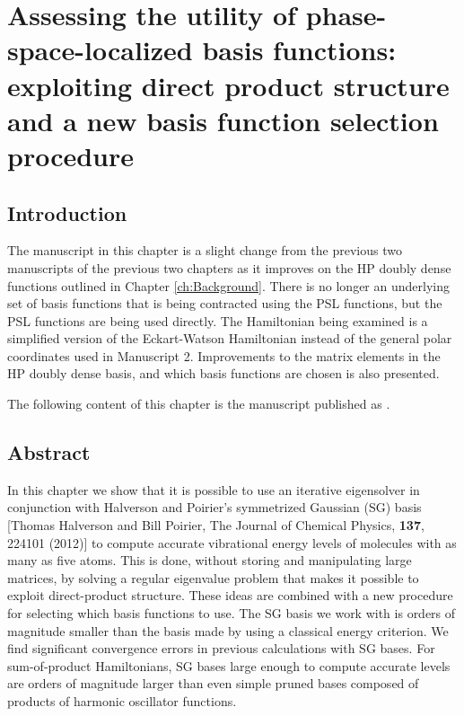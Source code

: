 
%
\chapter{Assessing the utility of phase-space-localized basis functions:  exploiting direct product structure and  a new basis function selection procedure \label{ch:JCP2} }
\thispagestyle{empty}
\section{Introduction}
The manuscript in this chapter is a slight change from the previous two manuscripts of the previous two chapters as it improves on the HP doubly dense functions outlined in Chapter \ref{ch:Background}.  There is no longer an underlying set of basis functions that is being contracted using the PSL functions, but the PSL functions are being used directly.  The Hamiltonian being examined is a simplified version of the Eckart-Watson Hamiltonian instead of the general polar coordinates used in Manuscript 2.  Improvements to the matrix elements in the HP doubly dense basis, and which basis functions are chosen is also presented.

The following content of this chapter is the manuscript published as .
%
\section{Abstract}
% 

In this chapter we show that it is possible to use an iterative eigensolver in conjunction with Halverson and Poirier's symmetrized Gaussian (SG) basis
[Thomas Halverson and Bill Poirier, The Journal of Chemical Physics,   {\bf{137}}, 224101 (2012)] 
 to compute 
accurate vibrational energy levels of molecules with as many as five atoms.
This is done,    without storing and manipulating large matrices,   by solving a regular eigenvalue problem that makes it possible to 
exploit direct-product structure.  
These ideas are combined with 
 a new procedure for selecting which basis functions to use. 
  The SG  basis we work with is orders of magnitude smaller than the basis made by using a  classical  energy criterion. We find significant convergence errors in previous calculations with SG bases.   For sum-of-product Hamiltonians, 
 SG bases large enough to compute accurate levels are 
orders of magnitude larger than even  simple pruned bases composed of products of harmonic oscillator functions.  











